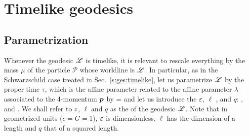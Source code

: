 

\section{Timelike geodesics}

\subsection{Parametrization}

Whenever the geodesic $\mathscr{L}$ is timelike, it is relevant to
rescale everything by the mass $\mu$ of the particle $\mathscr{P}$ whose worldline is $\mathscr{L}$.
In particular, as in the Schwarzschild case treated in Sec.~\ref{s:ges:timelike},
let us parametrize $\mathscr{L}$ by the proper time $\tau$, which is the affine parameter
related to the affine parameter $\lambda$ associated to the 4-momentum $\bm{p}$
by
\be \label{e:gek:tau_mu_lamb}
    \tau = \mu \lambda
\ee
and let us introduce the
 $\varepsilon$,
$\ell$ ,
and  $q$:
\be \label{e:gek:def_eps_ell_mQ}
  , \qquad
   \qquad\mbox{and}\qquad
   .
\ee
We shall refer to $\varepsilon$, $\ell$ and $q$ as the
of the geodesic $\mathscr{L}$. Note that in geometrized units ($c=G=1$), $\varepsilon$ is
dimensionless, $\ell$ has the dimension of a length and $q$ that of a squared length.

